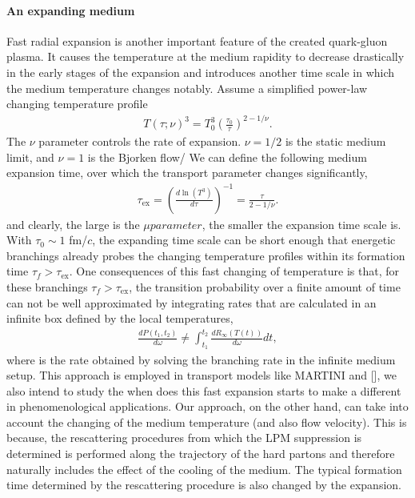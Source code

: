 \paragraph{An expanding medium}
Fast radial expansion is another important feature of the created quark-gluon plasma. 
It causes the temperature at the medium rapidity to decrease drastically in the early stages of the expansion and introduces another time scale in which the medium temperature changes notably.
Assume a simplified power-law changing temperature profile
\begin{eqnarray}
T(\tau; \nu)^3 = T_0^3\left(\frac{\tau_0}{\tau}\right)^{2-1/\nu}.
\end{eqnarray}
The $\nu$ parameter controls the rate of expansion. 
$\nu = 1/2$ is the static medium limit, and $\nu=1$ is the Bjorken flow/
We can define the following medium expansion time, over which the transport parameter changes significantly,
\begin{eqnarray}
\tau_{\textrm{ex}} = \left(\frac{d\ln(T^3)}{d \tau} \right)^{-1} = \frac{\tau}{2-1/\nu}.
\end{eqnarray}
and clearly, the large is the $\mu parameter$, the smaller the expansion time scale is.
With $\tau_0 \sim 1$ fm/$c$, the expanding time scale can be short enough that energetic branchings already probes the changing temperature profiles within its formation time $\tau_f > \tau_{\textrm{ex}}$.
One consequences of this fast changing of temperature is that, for these branchings $\tau_f > \tau_{\textrm{ex}}$, the transition probability over a finite amount of time can not be well approximated by integrating rates that are calculated in an infinite box defined by the local temperatures,
\begin{eqnarray}
\frac{dP(t_1, t_2)}{d\omega} \neq \int_{t_1}^{t_2} \frac{dR_{\infty}(T(t))}{d\omega} dt,
\end{eqnarray}
where is the rate obtained by solving the branching rate in the infinite medium setup. 
This approach is employed in transport models like MARTINI and [], we also intend to study the when does this fast expansion starts to make a different in phenomenological applications.
Our approach, on the other hand, can take into account the changing of the medium temperature (and also flow velocity).
This is because, the rescattering procedures from which the LPM suppression is determined is performed along the trajectory of the hard partons and therefore naturally includes the effect of the cooling of the medium.
The typical formation time determined by the rescattering procedure is also changed by the expansion.

